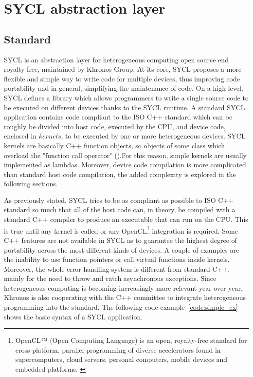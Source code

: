 \chapter{SYCL abstraction layer}
\label{ch:2}
\section{Standard}
\label{ch:sycl_standard}
SYCL is an abstraction layer for heterogeneous computing open source end royalty free, maintained by Khronos Group. At its core, SYCL proposes a more flexible and simple way to write code for multiple devices, thus improving code portability and in general, simplifying the maintenance of code. On a high level, SYCL defines a library which allows programmers to write a single source code to be executed on different devices thanks to the SYCL runtime. A standard SYCL application contains code compliant to the ISO C++ standard which can be roughly be divided into host code, executed by the CPU, and device code, enclosed in $kernels$, to be executed by one or more heterogeneous devices. SYCL kernels are basically C++ function objects, so objects of some class which overload the "function call operator" ().For this reason, simple kernels are usually implemented as lambdas. Moreover, device code compilation is more complicated than standard host code compilation, the added complexity is explored in the following sections. 

As previously stated, SYCL tries to be as compliant as possible to ISO C++ standard so much that all of the host code can, in theory, be compiled with a standard C++ compiler to produce an executable that can run on the CPU. This is true until any kernel is called or any OpenCL\footnote{OpenCL™ (Open Computing Language) is an open, royalty-free standard for cross-platform, parallel programming of diverse accelerators found in supercomputers, cloud servers, personal computers, mobile devices and embedded platforms. \cite{OpenCL}} integration is required. Some C++ features are not available in SYCL as to guarantee the highest degree of portability across the most different kinds of devices. A couple of examples are the inability to use function pointers or call virtual functions inside kernels. Moreover, the whole error handling system is different from standard C++, mainly for the need to throw and catch asynchronous exceptions. Since heterogeneous computing is becoming increasingly more relevant year over year, Khronos is also cooperating with the C++ committee to integrate heterogeneous programming into the standard. The following code example~\ref{code:simple_ex} shows the basic syntax of a SYCL application.

